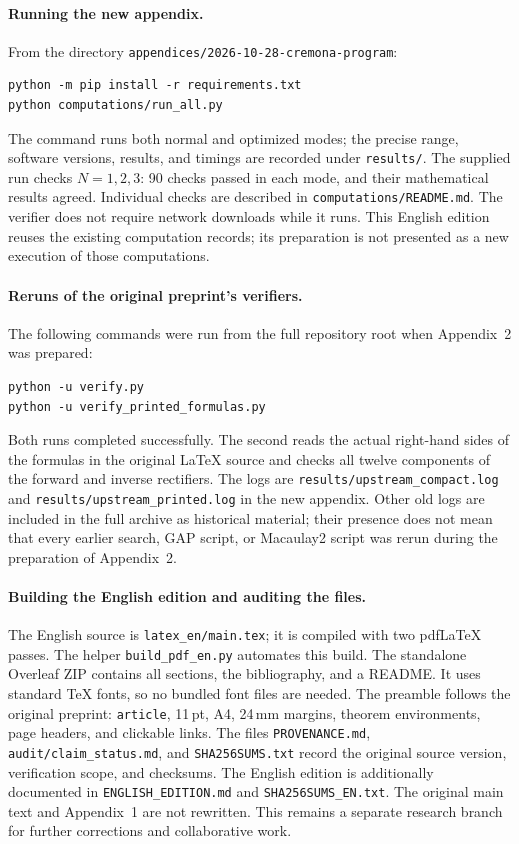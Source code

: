 \paragraph{Running the new appendix.}
From the directory \nolinkurl{appendices/2026-10-28-cremona-program}:
\begin{verbatim}
python -m pip install -r requirements.txt
python computations/run_all.py
\end{verbatim}
The command runs both normal and optimized modes; the precise range,
software versions, results, and timings are recorded under \texttt{results/}.
The supplied run checks $N=1,2,3$: 90 checks passed in each mode, and
their mathematical results agreed.
Individual checks are described in \nolinkurl{computations/README.md}.
The verifier does not require network downloads while it runs.
This English edition reuses the existing computation records; its
preparation is not presented as a new execution of those computations.

\paragraph{Reruns of the original preprint's verifiers.}
The following commands were run from the full repository root when
Appendix~2 was prepared:
\begin{verbatim}
python -u verify.py
python -u verify_printed_formulas.py
\end{verbatim}
Both runs completed successfully. The second reads the actual right-hand
sides of the formulas in the original \LaTeX{} source and checks all
twelve components of the forward and inverse rectifiers. The logs are
\nolinkurl{results/upstream_compact.log} and
\nolinkurl{results/upstream_printed.log} in the new appendix.
Other old logs are included in the full archive as historical material;
their presence does not mean that every earlier search, GAP script, or
Macaulay2 script was rerun during the preparation of Appendix~2.

\paragraph{Building the English edition and auditing the files.}
The English source is \nolinkurl{latex_en/main.tex}; it is compiled with
two pdf\LaTeX{} passes. The helper \nolinkurl{build_pdf_en.py} automates
this build. The standalone Overleaf ZIP contains all sections, the
bibliography, and a README. It uses standard \TeX{} fonts, so no bundled
font files are needed. The preamble follows the original preprint:
\texttt{article}, 11\,pt, A4, 24\,mm margins, theorem environments,
page headers, and clickable links.
The files \nolinkurl{PROVENANCE.md}, \nolinkurl{audit/claim_status.md},
and \nolinkurl{SHA256SUMS.txt} record the original source version,
verification scope, and checksums. The English edition is additionally
documented in \nolinkurl{ENGLISH_EDITION.md} and
\nolinkurl{SHA256SUMS_EN.txt}.
The original main text and Appendix~1 are not rewritten. This remains
a separate research branch for further corrections and collaborative work.
